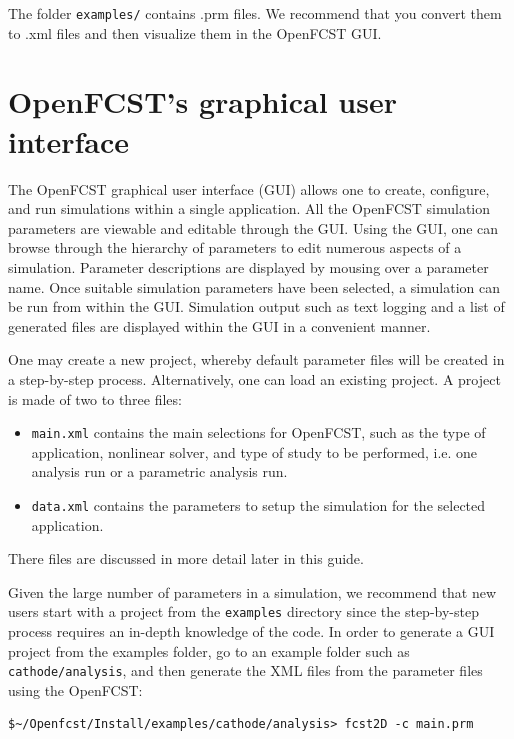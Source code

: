 The folder \texttt{examples/} contains .prm files. We recommend that you convert them to .xml files and then visualize them in the OpenFCST GUI. 

\section{OpenFCST's graphical user interface}

The OpenFCST graphical user interface (GUI) allows one to create, configure, and run simulations within a single application. All the OpenFCST simulation parameters are viewable and editable through the GUI. Using the GUI, one can browse through the hierarchy of parameters to edit numerous aspects of a simulation. Parameter descriptions are displayed by mousing over a parameter name. Once suitable simulation parameters have been selected, a simulation can be run from within the GUI. Simulation output such as text logging and a list of generated files are displayed within the GUI in a convenient manner.

One may create a new project, whereby default parameter files will be created in a step-by-step process. Alternatively, one can load an existing project. A project is made of two to three files:
\begin{itemize}
 \item \texttt{main.xml} contains the main selections for OpenFCST, such as the type of application, nonlinear solver, and type of study to be performed, i.e. one analysis run or a parametric analysis run.
 \item \texttt{data.xml} contains the parameters to setup the simulation for the selected application.
\end{itemize}
There files are discussed in more detail later in this guide.

Given the large number of parameters in a simulation, we recommend that new users start with a project from the \texttt{examples} directory since the step-by-step process requires an in-depth knowledge of the code. In order to generate a GUI project from the examples folder, go to an example folder such as \texttt{cathode/analysis}, and then generate the XML files from the parameter files using the OpenFCST:
\begin{lstlisting}
$~/Openfcst/Install/examples/cathode/analysis> fcst2D -c main.prm 
\end{lstlisting}

